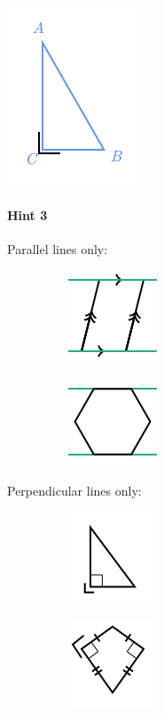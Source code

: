 \documentclass[twocolumn,10pt]{article}
\def\shrinkfactor{0.55}
\begin{document}
\includegraphics[scale=\shrinkfactor]{figures/497661f48f441186b5e021d8ca8c4f0c7449214f.png}

\paragraph{Hint 3}Parallel lines only:

$\phantom{xxxxxxxx}$
\includegraphics[scale=\shrinkfactor]{figures/dc97e97ad57144cae5a8b5bfdc5d541d8d66aa00.png}
 
$\phantom{xxxxxxxx}$
\includegraphics[scale=\shrinkfactor]{figures/a8914ec8b688d03af4fc47bdfdb83edcce453d65.png}

Perpendicular lines only:

$\phantom{xxxxxxxx}$
\includegraphics[scale=\shrinkfactor]{figures/22dbb4135afcdee971b389f3b794eb3a9a08ea40.png}

$\phantom{xxxxxxxx}$
\includegraphics[scale=\shrinkfactor]{figures/789e2f97ce566bdea069b01d730472c5c267c9de.png}
\end{document}
